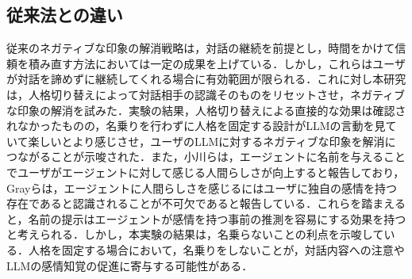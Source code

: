 \documentclass[10pt,twocolumn]{jsarticle}
\begin{document}
\subsection{従来法との違い}
従来のネガティブな印象の解消戦略は，対話の継続を前提とし，時間をかけて信頼を積み直す方法\cite{Martell2025,Esterwood2023}においては一定の成果を上げている．しかし，これらはユーザが対話を諦めずに継続してくれる場合に有効範囲が限られる．これに対し本研究は，人格切り替えによって対話相手の認識そのものをリセットさせ，ネガティブな印象の解消を試みた．実験の結果，人格切り替えによる直接的な効果は確認されなかったものの，名乗りを行わずに人格を固定する設計がLLMの言動を見ていて楽しいとより感じさせ，ユーザのLLMに対するネガティブな印象を解消につながることが示唆された．また，小川ら\cite{Ogawa2013}は，エージェントに名前を与えることでユーザがエージェントに対して感じる人間らしさが向上すると報告しており，Grayら\cite{Gray2007}は，エージェントに人間らしさを感じるにはユーザに独自の感情を持つ存在であると認識されることが不可欠であると報告している．これらを踏まえると，名前の提示はエージェントが感情を持つ事前の推測を容易にする効果を持つと考えられる．しかし，本実験の結果は，名乗らないことの利点を示唆している．人格を固定する場合において，名乗りをしないことが，対話内容への注意やLLMの感情知覚の促進に寄与する可能性がある．
\end{document}
